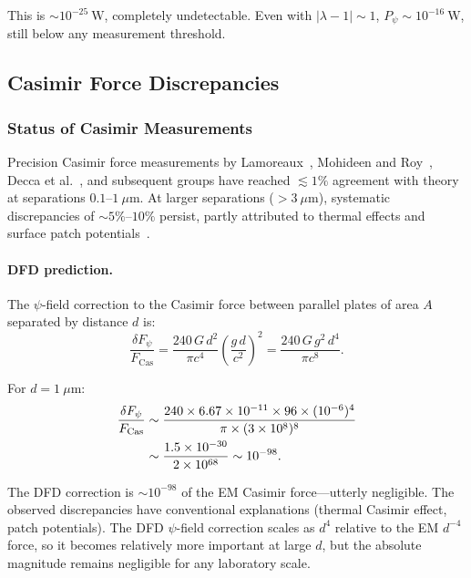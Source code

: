 \documentclass[aps,prd,twocolumn,showpacs,preprintnumbers,superscriptaddress,nofootinbib]{revtex4-2}
\begin{document}
This is $\sim 10^{-25}~\mathrm{W}$, completely undetectable.  Even with
$|\lambda-1| \sim 1$, $P_\psi \sim 10^{-16}~\mathrm{W}$, still below
any measurement threshold.

\subsection{Casimir Force Discrepancies}\label{sec:casimir}

\subsubsection{Status of Casimir Measurements}

Precision Casimir force measurements by Lamoreaux~\cite{Lamoreaux1997},
Mohideen and Roy~\cite{Mohideen1998}, Decca et al.~\cite{Decca2005},
and subsequent groups have reached $\lesssim 1\%$ agreement with
theory at separations $0.1$--$1~\mu\mathrm{m}$.  At larger separations
($> 3~\mu\mathrm{m}$), systematic discrepancies of $\sim 5\%$--$10\%$
persist, partly attributed to thermal effects and surface patch
potentials~\cite{Behunin2014,Bimonte2021}.

\paragraph{DFD prediction.}
The $\psi$-field correction to the Casimir force between parallel plates
of area $A$ separated by distance $d$ is:
\begin{equation}\label{eq:casimir-correction}
\frac{\delta F_\psi}{F_{\mathrm{Cas}}} = \frac{240\,G\,d^2}{\pi c^4}
  \left(\frac{g\,d}{c^2}\right)^2 = \frac{240\,G\,g^2\,d^4}{\pi c^8}.
\end{equation}

For $d = 1~\mu\mathrm{m}$:
\begin{align}
\frac{\delta F_\psi}{F_{\mathrm{Cas}}}
  &\sim \frac{240\times 6.67\times 10^{-11}\times 96\times (10^{-6})^4}{\pi\times(3\times 10^8)^8} \notag\\
  &\sim \frac{1.5\times 10^{-30}}{2\times 10^{68}} \sim 10^{-98}.
\end{align}

The DFD correction is $\sim 10^{-98}$ of the EM Casimir force---utterly
negligible.  The observed discrepancies have conventional explanations
(thermal Casimir effect, patch potentials).  The DFD $\psi$-field
correction scales as $d^4$ relative to the EM $d^{-4}$ force, so it
becomes relatively more important at large $d$, but the absolute
magnitude remains negligible for any laboratory scale.
\end{document}
